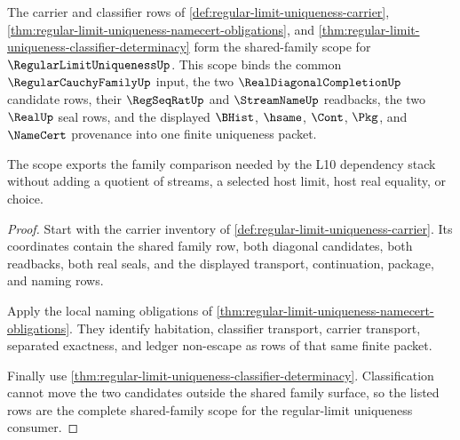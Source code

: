 \begin{theorem}
\label{thm:regular-limit-uniqueness-shared-family-scope}
The carrier and classifier rows of \autoref{def:regular-limit-uniqueness-carrier}, \autoref{thm:regular-limit-uniqueness-namecert-obligations}, and \autoref{thm:regular-limit-uniqueness-classifier-determinacy} form the shared-family scope for $\RegularLimitUniquenessUp$. This scope binds the common $\RegularCauchyFamilyUp$ input, the two $\RealDiagonalCompletionUp$ candidate rows, their $\RegSeqRatUp$ and $\StreamNameUp$ readbacks, the two $\RealUp$ seal rows, and the displayed $\BHist$, $\hsame$, $\Cont$, $\Pkg$, and $\NameCert$ provenance into one finite uniqueness packet.

The scope exports the family comparison needed by the L10 dependency stack without adding a quotient of streams, a selected host limit, host real equality, or choice.
\end{theorem}
\begin{proof}
Start with the carrier inventory of \autoref{def:regular-limit-uniqueness-carrier}. Its coordinates contain the shared family row, both diagonal candidates, both readbacks, both real seals, and the displayed transport, continuation, package, and naming rows.

Apply the local naming obligations of \autoref{thm:regular-limit-uniqueness-namecert-obligations}. They identify habitation, classifier transport, carrier transport, separated exactness, and ledger non-escape as rows of that same finite packet.

Finally use \autoref{thm:regular-limit-uniqueness-classifier-determinacy}. Classification cannot move the two candidates outside the shared family surface, so the listed rows are the complete shared-family scope for the regular-limit uniqueness consumer.
\end{proof}

